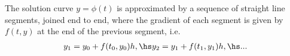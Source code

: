 \documentclass{article}
\begin{document}
\begin{theorem}
    The solution curve $y=\phi(t)$ is approximated by a sequence
    of straight line segments, joined end to end, where the gradient
    of each segment is given by $f(t,y)$ at the end of the previous
    segment, i.e.
    \begin{align*}
        y_1 = y_0+f(t_0, y_0)h,\hs y_2=y_1+f(t_1,y_1)h,\hs ...
    \end{align*} 
\end{theorem}
\end{document}
